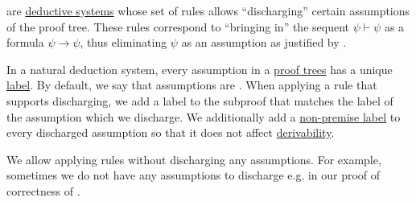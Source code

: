 \begin{definition}\label{def:natural_deduction_system}
   are \hyperref[def:deductive_system]{deductive systems} whose set of rules allows \enquote{discharging} certain assumptions of the proof tree. These rules correspond to \enquote{bringing in} the sequent \( \psi \vdash \psi \) as a formula \( \psi \to \psi \), thus eliminating \( \psi \) as an assumption as justified by .

  In a natural deduction system, every assumption in a \hyperref[def:proof_tree]{proof trees} has a unique \hyperref[def:labeled_set]{label}. By default, we say that assumptions are . When applying a rule that supports discharging, we add a label to the subproof that matches the label of the assumption which we discharge. We additionally add a \hyperref[def:proof_tree/premises]{non-premise label} to every discharged assumption so that it does not affect \hyperref[def:proof_derivability]{derivability}.

  We allow applying rules without discharging any assumptions. For example, sometimes we do not have any assumptions to discharge e.g. in our proof of correctness of .
\end{definition}

